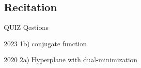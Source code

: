 \subsection{Recitation}


QUIZ Qestions

2023 1b) conjugate function

2020 2a) Hyperplane with dual-minimization



